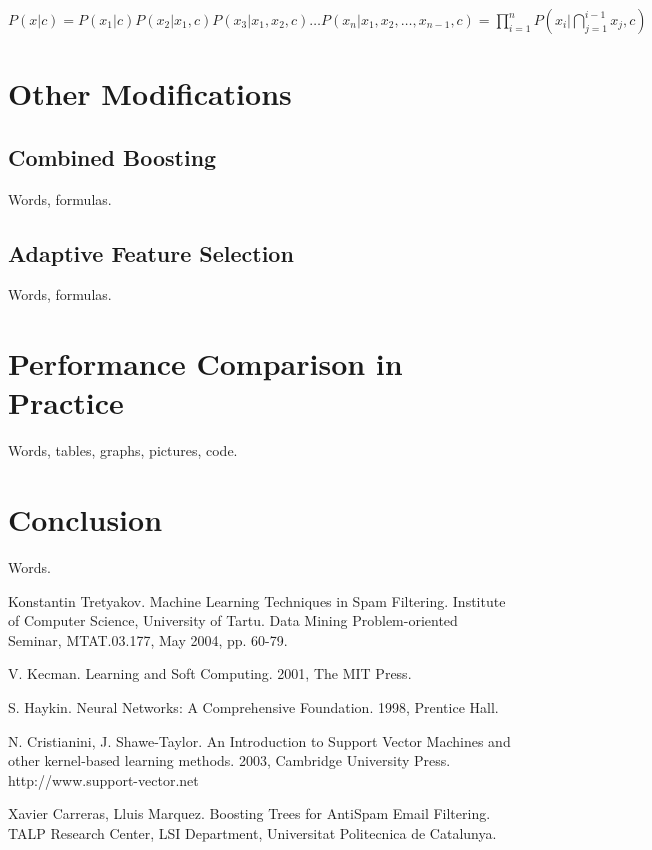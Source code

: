 \documentclass[12pt]{report}
\begin{document}
\begin{center}
	$P(x | c) = P(x_1 | c) P(x_2 | x_1, c) P(x_3 | x_1, x_2, c) \dots P(x_n | x_1, x_2, \dots, x_{n - 1}, c) = \prod_{i=1}^{n}P(x_i | \bigcap_{j = 1}^{i - 1} x_j, c)$
\end{center}


\newpage


\chapter{Other Modifications}

\section{Combined Boosting}

Words, formulas.

\newpage

\section{Adaptive Feature Selection}

Words, formulas.

\newpage


\chapter{Performance Comparison in Practice}

Words, tables, graphs, pictures, code.

\newpage


\chapter*{Conclusion}

Words.

\newpage



\begin{thebibliography}{30}

 Konstantin Tretyakov. Machine Learning Techniques in Spam Filtering. Institute of Computer Science, University of Tartu. Data Mining Problem-oriented Seminar, MTAT.03.177, May 2004, pp. 60-79.

 V. Kecman. Learning and Soft Computing. 2001, The MIT Press.

 S. Haykin. Neural Networks: A Comprehensive Foundation. 1998, Prentice
Hall.

 N. Cristianini, J. Shawe-Taylor. An Introduction to Support Vector Machines and other kernel-based learning methods. 2003, Cambridge University Press. http://www.support-vector.net

 Xavier Carreras, Lluis Marquez. Boosting Trees for AntiSpam
Email Filtering. TALP Research Center, LSI Department, Universitat Politecnica de Catalunya.

\end{thebibliography}
\end{document}
